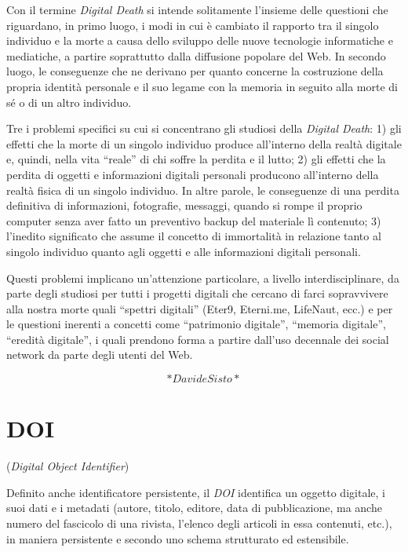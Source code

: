 \documentclass[
  b5paper,
  twoside,
  12pt,
  chapterprefix=false,
  bibliography=totocnumbered,
  parskip=false]{scrbook}
\begin{document}
Con il termine \emph{Digital Death} si intende solitamente l'insieme delle
questioni che riguardano, in primo luogo, i modi in cui è cambiato il
rapporto tra il singolo individuo e la morte a causa dello sviluppo
delle nuove tecnologie informatiche e mediatiche, a partire soprattutto
dalla diffusione popolare del Web. In secondo luogo, le conseguenze che
ne derivano per quanto concerne la costruzione della propria identità
personale e il suo legame con la memoria in seguito alla morte di sé o
di un altro individuo.

Tre i problemi specifici su cui si concentrano gli studiosi della
\emph{Digital Death}: 1) gli effetti che la morte di un singolo individuo
produce all'interno della realtà digitale e, quindi, nella vita \enquote{reale}
di chi soffre la perdita e il lutto; 2) gli effetti che la perdita di
oggetti e informazioni digitali personali producono all'interno della
realtà fisica di un singolo individuo. In altre parole, le conseguenze
di una perdita definitiva di informazioni, fotografie, messaggi, quando
si rompe il proprio computer senza aver fatto un preventivo backup del
materiale lì contenuto; 3) l'inedito significato che assume il concetto
di immortalità in relazione tanto al singolo individuo quanto agli
oggetti e alle informazioni digitali personali.

Questi problemi implicano un'attenzione particolare, a livello
interdisciplinare, da parte degli studiosi per tutti i progetti digitali
che cercano di farci sopravvivere alla nostra morte quali \enquote{spettri
digitali} (Eter9, Eterni.me, LifeNaut, ecc.) e per le questioni inerenti
a concetti come \enquote{patrimonio digitale}, \enquote{memoria digitale}, \enquote{eredità
digitale}, i quali prendono forma a partire dall'uso decennale dei
social network da parte degli utenti del Web.

\[*Davide Sisto*\]

\hypertarget{doi}{%
\chapter{DOI}\label{doi}}

(\emph{Digital Object Identifier})

Definito anche identificatore persistente, il \emph{DOI} identifica un
oggetto digitale, i suoi dati e i metadati (autore, titolo, editore,
data di pubblicazione, ma anche numero del fascicolo di una rivista,
l'elenco degli articoli in essa contenuti, etc.), in maniera persistente
e secondo uno schema strutturato ed estensibile.
\end{document}
